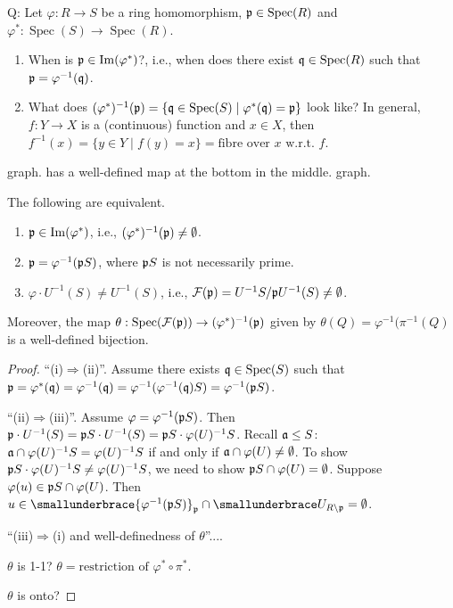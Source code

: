 \begin{proposition}
\end{proposition}


Q: Let $\varphi: R \to S$ be a ring homomorphism, $\mathfrak{p} \in \operatorname{Spec}(R)$ and $\varphi^*: \operatorname{Spec}(S) \to \operatorname{Spec}(R)$.
\begin{enumerate}
    \item When is $\mathfrak{p} \in \operatorname{Im}(\varphi^*)$?, i.e., when does there exist $\mathfrak{q} \in \operatorname{Spec}(R)$ such that $\mathfrak{p}  = \varphi^{-1}(\mathfrak{q})$.
    \item What does $(\varphi^*)^{-1}(\mathfrak{p}) = \{\mathfrak{q} \in \operatorname{Spec}(S) \mid \varphi^*(\mathfrak{q}) = \mathfrak{p}\}$ look like? In general, $f: Y \to X$ is a (continuous) function and $x \in X$, then $f^{-1}(x) = \{y \in Y \mid f(y) = x\} = \text{fibre over $x$ w.r.t. $f$}$.
\end{enumerate}

\begin{construction}
    graph. has a well-defined map at the bottom in the middle.
    graph.
\end{construction}

\begin{theorem}
    The following are equivalent.
    \begin{enumerate}
        \item $\mathfrak{p} \in \operatorname{Im}(\varphi^*)$, i.e., $(\varphi^*)^{-1}(\mathfrak{p}) \neq \emptyset$.
        \item $\mathfrak{p} = \varphi^{-1}(\mathfrak{p} S)$, where $\mathfrak{p} S$ is not necessarily prime.
        \item $\varphi \cdot U^{-1}(S) \neq U^{-1}(S)$, i.e., $\mathcal{F}(\mathfrak{p}) = U^{-1}S/\mathfrak{p} U^{-1}(S) \neq \emptyset$.
    \end{enumerate}
    Moreover, the map $\theta: \operatorname{Spec}(\mathcal{F}(\mathfrak{p})) \to (\varphi^*)^{-1}(\mathfrak{p})$ given by $\theta(Q) = \varphi^{-1}(\pi^{-1}(Q)$ is a well-defined bijection.
\end{theorem}

\begin{proof}
    ``(i)$\Rightarrow$(ii)''. Assume there exists $\mathfrak{q} \in \operatorname{Spec}(S)$ such that $\mathfrak{p} = \varphi^*(\mathfrak{q}) = \varphi^{-1}(\mathfrak{q}) = \varphi^{-1}(\varphi^{-1}(\mathfrak{q})S) = \varphi^{-1}(\mathfrak{p} S)$. \par 
    ``(ii)$\Rightarrow$(iii)''. Assume $\varphi = \varphi^{-1}(\mathfrak{p} S)$. Then $\mathfrak{p} \cdot U^{-1}(S) = \mathfrak{p} S \cdot U^{-1}(S) = \mathfrak{p} S \cdot \varphi(U)^{-1}S$. Recall $\mathfrak{a} \leq S$: $\mathfrak{a} \cap \varphi(U)^{-1}S = \varphi(U)^{-1}S$ if and only if $\mathfrak{a} \cap \varphi(U) \neq \emptyset$. To show $\mathfrak{p} S \cdot \varphi(U)^{-1}S \neq \varphi(U)^{-1}S$, we need to show $\mathfrak{p} S \cap \varphi(U) = \emptyset$. Suppose $\varphi(u) \in \mathfrak{p} S \cap \varphi(U)$. Then $u \in \smallunderbrace{\varphi^{-1}(\ffp S)}_{\ffp} \cap \smallunderbrace U_{R \setminus \ffp} = \emptyset$. \par 
    ``(iii)$\Rightarrow$(i) and well-definedness of $\theta$''.... \par 
    $\theta$ is 1-1? $\theta = \text{restriction of $\varphi^* \circ \pi^{*}$}$. \par 
    $\theta$ is onto?
\end{proof}

